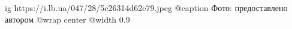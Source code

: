  
 
 
 
 

\ifcmt
  ig https://i.lb.ua/047/28/5c26314d62e79.jpeg
	@caption Фото: предоставлено автором
  @wrap center
  @width 0.9
\fi
